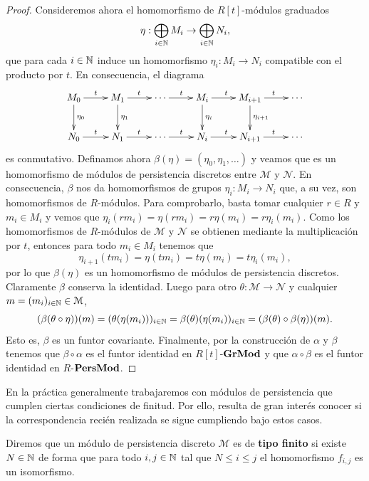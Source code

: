 \begin{proof}
	Consideremos ahora el homomorfismo de \(R[t]\)-módulos graduados
	\[
		\eta : \bigoplus_{i \in \mathbb{N}} M_i \to \bigoplus_{i \in \mathbb{N}} N_i,
	\]
	que para cada \(i \in \mathbb{N}\) induce un homomorfismo \(\eta_i : M_i \to N_i\) compatible con el producto por \(t\). En consecuencia, el diagrama
	\[
	\xymatrix{
		M_0 \ar@{->}[r]^{t} \ar@{->}[d]^{\eta_0} & M_1 \ar@{->}[r]^{t} \ar@{->}[d]^{\eta_1} & \cdots \ar@{->}[r]^{t} & M_i \ar@{->}[r]^{t} \ar@{->}[d]^{\eta_i} & M_{i+1} \ar@{->}[r]^{t} \ar@{->}[d]^{\eta_{i+1}} & \cdots \\
		N_0 \ar@{->}[r]^{t} & N_1 \ar@{->}[r]^{t} & \cdots \ar@{->}[r]^{t} & N_i \ar@{->}[r]^{t} & N_{i+1} \ar@{->}[r]^{t} & \cdots
	}
	\]
	es conmutativo. Definamos ahora \(\beta(\eta) = (\eta_0, \eta_1, \ldots)\) y veamos que es un homomorfismo de módulos de persistencia discretos entre \(\mathcal{M}\) y \(\mathcal{N}\). En consecuencia, \(\beta\) nos da homomorfismos de grupos \(\eta_i : M_i \to N_i\) que, a su vez, son homomorfismos de \(R\)-módulos. Para comprobarlo, basta tomar cualquier \(r \in R\) y \(m_i \in M_i\) y vemos que \(\eta_i(rm_i) = \eta(rm_i) = r \eta(m_i) = r \eta_i(m_i)\). Como los homomorfismos de \(R\)-módulos de \(\mathcal{M}\) y \(\mathcal{N}\) se obtienen mediante la multiplicación por \(t\), entonces para todo \(m_i \in M_i\) tenemos que
	\[
		\eta_{i+1}(tm_i) = \eta(tm_i) = t\eta(m_i) = t \eta_i(m_i),
	\]
	por lo que \(\beta(\eta)\) es un homomorfismo de módulos de persistencia discretos.
	Claramente \(\beta\) conserva la identidad. Luego para otro \(\theta : \mathcal{M} \to \mathcal{N}\) y cualquier \(m=(m_i)_{i \in \mathbb{N}} \in \mathcal{M}\),
	\[
		(\beta(\theta \circ \eta))(m) = (\theta(\eta(m_i)))_{i \in \mathbb{N}} = \beta(\theta)(\eta(m_i))_{i \in \mathbb{N}} = (\beta(\theta) \circ \beta(\eta))(m).
	\]
	Esto es, \(\beta\) es un funtor covariante. Finalmente, por la construcción de \(\alpha\) y \(\beta\) tenemos que \(\beta \circ \alpha\) es el funtor identidad en \(R[t]\)-\(\mathbf{GrMod}\) y que \(\alpha \circ \beta\) es el funtor identidad en \(R\)-\(\mathbf{PersMod}\).
\end{proof}

En la práctica generalmente trabajaremos con módulos de persistencia que cumplen ciertas condiciones de finitud. Por ello, resulta de gran interés conocer si la correspondencia recién realizada se sigue cumpliendo bajo estos casos.

\begin{definicion}
	Diremos que un módulo de persistencia discreto \(\mathcal{M}\) es de \textbf{tipo finito} si existe \(N \in \mathbb{N}\) de forma que para todo \(i,j \in \mathbb{N}\) tal que \(N \leq i \leq j\) el homomorfismo \(f_{i,j}\) es un isomorfismo.
\end{definicion}

